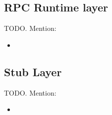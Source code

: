 \subsection{RPC Runtime layer} %
\label{sub:rpc_runtime_layer_design}
TODO. Mention:
\begin{itemize}
	\item 
\end{itemize}

\subsection{Stub Layer} %
\label{sub:stub_layer_design}
TODO. Mention:
\begin{itemize}
	\item 
\end{itemize}


